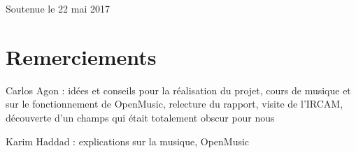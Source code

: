 \documentclass[a4paper,12pt]{article}
\begin{document}
\begin{titlepage}
\begin{center}
\vspace*{2cm}

{\large Soutenue le 22 mai 2017}\\[1cm]

\vfill

\end{center}
\end{titlepage}


\newpage\null\thispagestyle{empty}\newpage


\tableofcontents

\newpage\null\thispagestyle{empty}\newpage



\section{Remerciements}

Carlos Agon : idées et conseils pour la réalisation du projet, cours de musique et sur le fonctionnement de OpenMusic, relecture du rapport, visite de l'IRCAM, découverte d'un champs qui était totalement obscur pour nous

\par
Karim Haddad : explications sur la musique, OpenMusic


\newpage\null\thispagestyle{empty}\newpage



\listoffigures %









\pagestyle{fancy}









%





\nocite{*}
\end{document}
